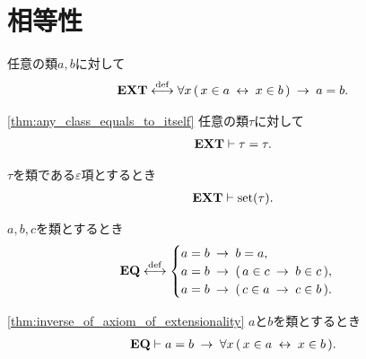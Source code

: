 \section{相等性}
	\begin{screen}
		\begin{axm}
			任意の類$a,b$に対して
			\begin{align}
				\mbox{{\bf EXT}} \overset{\mathrm{def}}{\longleftrightarrow} \forall x\, (\, x \in a \hspace{0.25em}\leftrightarrow\hspace{0.25em} x \in b\, ) 
				\hspace{0.25em}\rightarrow\hspace{0.25em} a=b.
			\end{align}
		\end{axm}
	\end{screen}
	
	\begin{screen}
		\begin{thm}[任意の類は自分自身と等しい]\ref{thm:any_class_equals_to_itself}
			任意の類$\tau$に対して
			\begin{align}
				\mbox{{\bf EXT}} \vdash \tau = \tau.
			\end{align}
		\end{thm}
	\end{screen}
	
	\begin{screen}
		\begin{thm}
			$\tau$を類である$\varepsilon$項とするとき
			\begin{align}
				\mbox{{\bf EXT}} \vdash \operatorname*{set} (\tau).
			\end{align}
		\end{thm}
	\end{screen}
	
	\begin{screen}
		\begin{axm}[相等性公理]
			$a,b,c$を類とするとき
			\begin{align}
				\mbox{{\bf EQ}} \overset{\mathrm{def}}{\longleftrightarrow}
				\begin{cases}
					a = b \hspace{0.25em}\rightarrow\hspace{0.25em} b = a, & \\
					a = b \hspace{0.25em}\rightarrow\hspace{0.25em} (\, a \in c \hspace{0.25em}\rightarrow\hspace{0.25em} b \in c\, ), & \\
					a = b \hspace{0.25em}\rightarrow\hspace{0.25em} (\, c \in a \hspace{0.25em}\rightarrow\hspace{0.25em} c \in b\, ). & 
				\end{cases}
			\end{align}
		\end{axm}
	\end{screen}
	
	\begin{screen}
		\begin{thm}[外延性の公理の逆も成り立つ]
		\ref{thm:inverse_of_axiom_of_extensionality}
			$a$と$b$を類とするとき
			\begin{align}
				\mbox{{\bf EQ}} \vdash 
				a = b \hspace{0.25em}\rightarrow\hspace{0.25em} \forall x\, (\, x \in a  \hspace{0.25em}\leftrightarrow\hspace{0.25em} x \in b\, ).
			\end{align}
		\end{thm}
	\end{screen}
	
